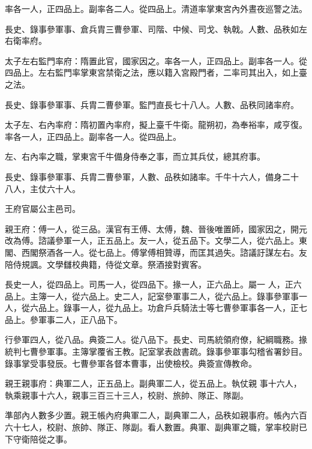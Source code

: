 \begin{pinyinscope}
 率各一人，正四品上。副率各二人。從四品上。清道率掌東宮內外晝夜巡警之法。



 長史、錄事參軍事、倉兵胄三曹參軍、司階、中候、司戈、執戟。人數、品秩如左右衛率府。



 太子左右監門率府：隋置此官，國家因之。率各一人，正四品上。副率各一人。從四品上。左右監門率掌東宮禁衛之法，應以籍入宮殿門者，二率司其出入，如上臺之法。



 長史、錄事參軍事、兵胄二曹參軍。監門直長七十八人。人數、品秩同諸率府。



 太子左、右內率府：隋初置內率府，擬上臺千牛衛。龍朔初，為奉裕率，咸亨復。率各一人，正四品上。副率各一人。從四品上。



 左、右內率之職，掌東宮千牛備身侍奉之事，而立其兵仗，總其府事。



 長史、錄事參軍事、兵胄二曹參軍，人數、品秩如諸率。千牛十六人，備身二十
 八人，主仗六十人。



 王府官屬公主邑司。



 親王府：傅一人，從三品。漢官有王傅、太傅，魏、晉後唯置師，國家因之，開元改為傅。諮議參軍一人，正五品上。友一人，從五品下。文學二人，從六品上。東閣、西閣祭酒各一人。從七品上。傅掌傅相贊導，而匡其過失。諮議訏謀左右。友陪侍規諷。文學讎校典籍，侍從文章。祭酒接對賓客。



 長史一人，從四品上。司馬一人，從四品下。掾一人，正六品上。屬一
 人，正六品上。主簿一人，從六品上。史二人，記室參軍事二人，從六品上。錄事參軍事一人，從六品上。錄事一人，從九品上。功倉戶兵騎法士等七曹參軍事各一人，正七品上。參軍事二人，正八品下。



 行參軍四人，從八品。典簽二人。從八品下。長史、司馬統領府僚，紀綱職務。掾統判七曹參軍事。主簿掌覆省王教。記室掌表啟書疏。錄事參軍事勾稽省署鈔目。錄事掌受事發辰。七曹參軍各督本曹事，出使檢校。典簽宣傳教命。



 親王親事府：典軍二人，正五品上。副典軍二人，從五品上。執仗親
 事十六人，執乘親事十六人，親事三百三十三人，校尉、旅帥、隊正、隊副。



 準部內人數多少置。親王帳內府典軍二人，副典軍二人，品秩如親事府。帳內六百六十七人，校尉、旅帥、隊正、隊副。看人數置。典軍、副典軍之職，掌率校尉已下守衛陪從之事。




\end{pinyinscope}
